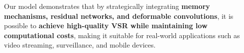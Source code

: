 Our model demonstrates that by strategically integrating \textbf{memory mechanisms, residual networks, and deformable convolutions}, it is possible to \textbf{achieve high-quality VSR while maintaining low computational costs}, making it suitable for real-world applications such as video streaming, surveillance, and mobile devices.
